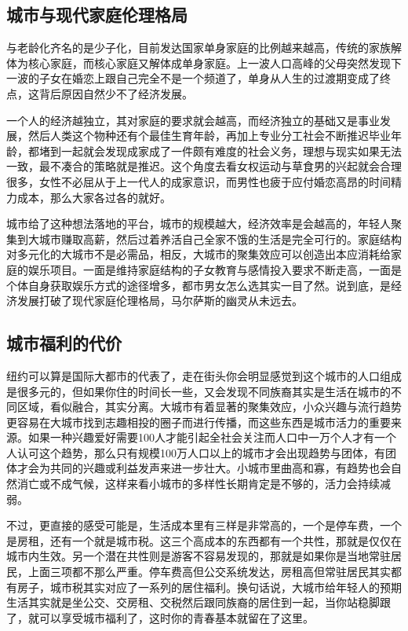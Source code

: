 \documentclass[
]{book}
\begin{document}
\hypertarget{ux57ceux5e02ux4e0eux73b0ux4ee3ux5bb6ux5eadux4f26ux7406ux683cux5c40}{%
\subsection{城市与现代家庭伦理格局}\label{ux57ceux5e02ux4e0eux73b0ux4ee3ux5bb6ux5eadux4f26ux7406ux683cux5c40}}

与老龄化齐名的是少子化，目前发达国家单身家庭的比例越来越高，传统的家族解体为核心家庭，而核心家庭又解体成单身家庭。上一波人口高峰的父母突然发现下一波的子女在婚恋上跟自己完全不是一个频道了，单身从人生的过渡期变成了终点，这背后原因自然少不了经济发展。

一个人的经济越独立，其对家庭的要求就会越高，而经济独立的基础又是事业发展，然后人类这个物种还有个最佳生育年龄，再加上专业分工社会不断推迟毕业年龄，都堵到一起就会发现成家成了一件颇有难度的社会义务，理想与现实如果无法一致，最不凑合的策略就是推迟。这个角度去看女权运动与草食男的兴起就会合理很多，女性不必屈从于上一代人的成家意识，而男性也疲于应付婚恋高昂的时间精力成本，那么大家各过各的就好。

城市给了这种想法落地的平台，城市的规模越大，经济效率是会越高的，年轻人聚集到大城市赚取高薪，然后过着养活自己全家不饿的生活是完全可行的。家庭结构对多元化的大城市不是必需品，相反，大城市的聚集效应可以创造出本应消耗给家庭的娱乐项目。一面是维持家庭结构的子女教育与感情投入要求不断走高，一面是个体自身获取娱乐方式的途径增多，都市男女怎么选其实一目了然。说到底，是经济发展打破了现代家庭伦理格局，马尔萨斯的幽灵从未远去。

\hypertarget{ux57ceux5e02ux798fux5229ux7684ux4ee3ux4ef7}{%
\subsection{城市福利的代价}\label{ux57ceux5e02ux798fux5229ux7684ux4ee3ux4ef7}}

纽约可以算是国际大都市的代表了，走在街头你会明显感觉到这个城市的人口组成是很多元的，但如果你住的时间长一些，又会发现不同族裔其实是生活在城市的不同区域，看似融合，其实分离。大城市有着显著的聚集效应，小众兴趣与流行趋势更容易在大城市找到志趣相投的圈子而进行传播，而这些东西是城市活力的重要来源。如果一种兴趣爱好需要100人才能引起全社会关注而人口中一万个人才有一个人认可这个趋势，那么只有规模100万人口以上的城市才会出现趋势与团体，有团体才会为共同的兴趣或利益发声来进一步壮大。小城市里曲高和寡，有趋势也会自然消亡或不成气候，这样来看小城市的多样性长期肯定是不够的，活力会持续减弱。

不过，更直接的感受可能是，生活成本里有三样是非常高的，一个是停车费，一个是房租，还有一个就是城市税。这三个高成本的东西都有一个共性，那就是仅仅在城市内生效。另一个潜在共性则是游客不容易发现的，那就是如果你是当地常驻居民，上面三项都不那么严重。停车费高但公交系统发达，房租高但常驻居民其实都有房子，城市税其实对应了一系列的居住福利。换句话说，大城市给年轻人的预期生活其实就是坐公交、交房租、交税然后跟同族裔的居住到一起，当你站稳脚跟了，就可以享受城市福利了，这时你的青春基本就留在了这里。
\end{document}
